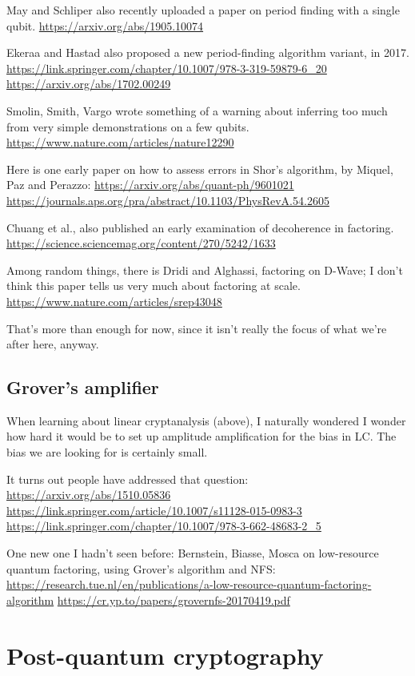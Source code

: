 \documentclass[%
 aip,
 jmp,%
 amsmath,amssymb,
 reprint,%
]{revtex4-1}
\begin{document}
May and Schliper also recently uploaded a paper on period finding with
a single qubit.
\url{https://arxiv.org/abs/1905.10074}

Ekeraa and Hastad also proposed a new period-finding algorithm
variant, in 2017.
\url{https://link.springer.com/chapter/10.1007/978-3-319-59879-6_20}
\url{https://arxiv.org/abs/1702.00249}

Smolin, Smith, Vargo wrote something of a warning about inferring too
much from very simple demonstrations on a few qubits.
\url{https://www.nature.com/articles/nature12290}

Here is one early paper on how to assess errors in Shor’s algorithm,
by Miquel, Paz and Perazzo:
\url{https://arxiv.org/abs/quant-ph/9601021}
\url{https://journals.aps.org/pra/abstract/10.1103/PhysRevA.54.2605}

Chuang et al., also published an early examination of decoherence in
factoring.
\url{https://science.sciencemag.org/content/270/5242/1633}

Among random things, there is Dridi and Alghassi,
factoring on D-Wave; I don’t think this paper tells us very much about factoring at scale.
\url{https://www.nature.com/articles/srep43048}

That's more than enough for now, since it isn't really the focus of
what we're after here, anyway.

\subsection{Grover's amplifier}

When learning about linear cryptanalysis (above), I naturally wondered
I wonder how hard it would be to set up amplitude amplification for
the bias in LC.  The bias we are looking for is certainly small.

It turns out people have addressed that question:
\url{https://arxiv.org/abs/1510.05836}
\url{https://link.springer.com/article/10.1007/s11128-015-0983-3}
\url{https://link.springer.com/chapter/10.1007/978-3-662-48683-2_5}

One new one I hadn't seen before:
Bernstein, Biasse, Mosca on low-resource quantum factoring, using
Grover's algorithm and NFS:
\url{https://research.tue.nl/en/publications/a-low-resource-quantum-factoring-algorithm}
\url{https://cr.yp.to/papers/grovernfs-20170419.pdf}

\section{Post-quantum cryptography}
\end{document}
